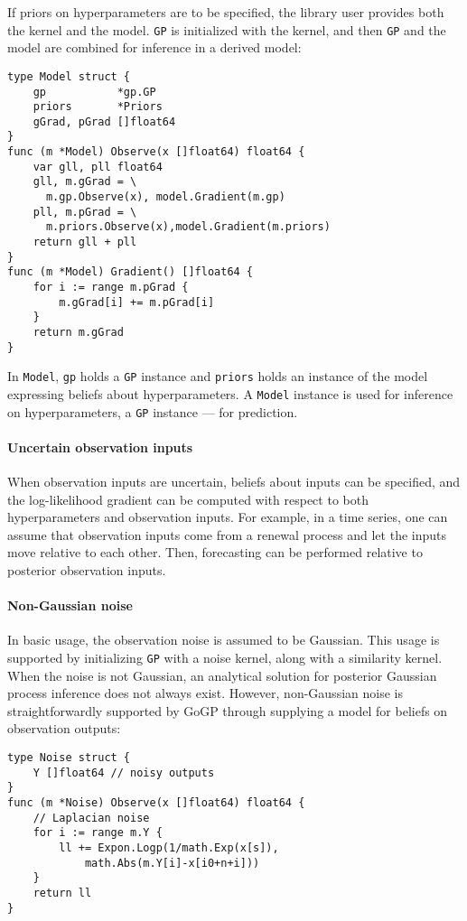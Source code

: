 \documentclass[sigplan,review]{acmart}\settopmatter{printfolios=true,printccs=false,printacmref=false}
\begin{document}
If priors on hyperparameters are to be specified, the library
user provides both the kernel and the model.  \lstinline{GP} is
initialized with the kernel, and then \lstinline{GP} and the
model are combined for inference in a derived model:
\begin{lstlisting}
type Model struct {
    gp           *gp.GP
    priors       *Priors
    gGrad, pGrad []float64
}
func (m *Model) Observe(x []float64) float64 {
    var gll, pll float64
    gll, m.gGrad = \
      m.gp.Observe(x), model.Gradient(m.gp)
    pll, m.pGrad = \
      m.priors.Observe(x),model.Gradient(m.priors)
    return gll + pll
}
func (m *Model) Gradient() []float64 {
	for i := range m.pGrad {
		m.gGrad[i] += m.pGrad[i]
	}
	return m.gGrad
}
\end{lstlisting}
In \lstinline{Model}, \lstinline{gp} holds a \lstinline{GP}
instance and \lstinline{priors} holds an instance of the model
expressing beliefs about hyperparameters. A \lstinline{Model}
instance is used for inference on hyperparameters, a
\lstinline{GP} instance --- for prediction.

\paragraph{Uncertain observation inputs}

When observation inputs are uncertain, beliefs about inputs can
be specified, and the log-likelihood gradient can be computed
with respect to both hyperparameters and observation inputs. For
example, in a time series, one can assume that observation
inputs come from a renewal process and let the inputs move 
relative to each other. Then, forecasting can be performed 
relative to posterior observation inputs.

\paragraph{Non-Gaussian noise}

In basic usage, the observation noise is assumed to be Gaussian.
This usage is supported by initializing \lstinline{GP} with a noise
kernel, along with a similarity kernel. When the noise is not
Gaussian, an analytical solution for posterior Gaussian process
inference does not always exist. However, non-Gaussian noise is
straightforwardly supported by GoGP through supplying a
model for beliefs on observation outputs:
\begin{lstlisting}
type Noise struct {
	Y []float64 // noisy outputs
}
func (m *Noise) Observe(x []float64) float64 {
	// Laplacian noise
	for i := range m.Y {
		ll += Expon.Logp(1/math.Exp(x[s]),
			math.Abs(m.Y[i]-x[i0+n+i]))
	}
	return ll
}
\end{lstlisting}



\end{document}
